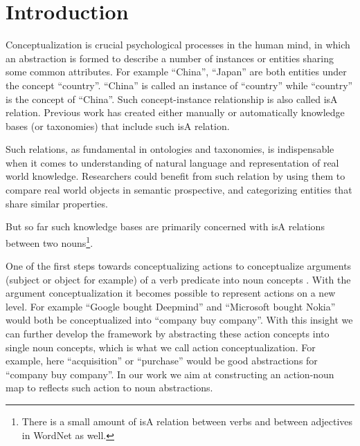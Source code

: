 \section{Introduction}

Conceptualization is crucial psychological processes in the human mind,
in which an abstraction is formed to describe a number of instances
or entities sharing some common attributes.
For example ``China'', ``Japan'' are both entities under the concept ``country''.
``China'' is called an instance of ``country'' while ``country'' is the concept
of ``China''. Such concept-instance relationship is also called isA relation.
Previous work \cite{wordnet,probase} has created either manually or automatically
knowledge bases (or taxonomies) that include such isA relation.

Such relations, as fundamental in ontologies and taxonomies, is indispensable when it
comes to understanding of natural language and representation of real world knowledge.
Researchers could benefit from such relation by using them to compare real world objects
in semantic prospective, and categorizing entities that share similar properties.

But so far such
knowledge bases are primarily concerned with isA relations between two nouns\footnote{There is a
small amount of isA relation between verbs and between adjectives in WordNet as well.}.


One of the first steps towards conceptualizing actions to conceptualize
arguments (subject or object for example) of a verb predicate into noun concepts \cite{action}.
With the argument conceptualization it becomes possible to
represent actions on a new level. For example ``Google bought Deepmind'' and
``Microsoft bought Nokia'' would both be conceptualized into ``company buy company''.
With this insight we can further develop the
framework by abstracting these action concepts into single noun concepts,
which is what we call action conceptualization. For example,
here ``acquisition'' or ``purchase'' would be good abstractions for ``company buy company''.
In our work we aim at constructing
an action-noun map to reflects such action to noun abstractions.

